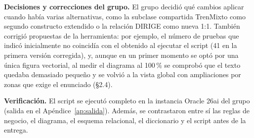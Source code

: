 \documentclass[11pt,a4paper]{article}
\DeclareRobustCommand{\_}{\textunderscore\allowbreak}
\begin{document}
\textbf{Decisiones y correcciones del grupo.} El grupo decidió qué cambios aplicar cuando había varias alternativas, como la subclase compartida Tren\_Mixto como segundo constructo extendido o la relación DIRIGE como nueva 1:1. También corrigió propuestas de la herramienta: por ejemplo, el número de pruebas que indicó inicialmente no coincidía con el obtenido al ejecutar el script (41 en la primera versión corregida), y, aunque en un primer momento se optó por una única figura vectorial, al medir el diagrama al 100\,\% se comprobó que el texto quedaba demasiado pequeño y se volvió a la vista global con ampliaciones por zonas que exige el enunciado (§2.4).

\textbf{Verificación.} El script se ejecutó completo en la instancia Oracle 26ai del grupo (salida en el Apéndice~\ref{ap:salida}). Además, se contrastaron entre sí las reglas de negocio, el diagrama, el esquema relacional, el diccionario y el script antes de la entrega.

\appendix
\end{document}

